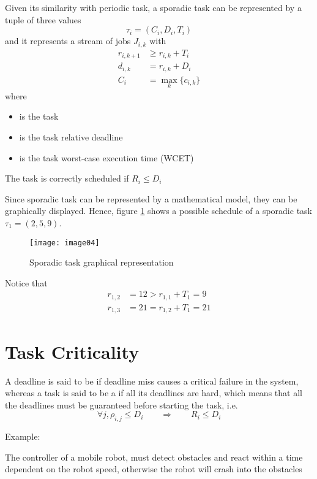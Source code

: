 Given its similarity with periodic task, a sporadic task can be represented by a tuple of three values
\[\tau_i = (C_i, D_i, T_i)\]
and it represents a stream of jobs $J_{i,k}$ with 
\begin{align*}
r_{i,k+1} &\ge r_{i,k} + T_i\\
d_{i,k} &= r_{i,k} + D_i\\
C_{i} &= \max_k \{c_{i,k}\}
\end{align*}
where
\begin{itemize}
\item{ is the task }
\item{ is the task relative deadline}
\item{ is the task worst-case execution time (WCET)}
\end{itemize}
The task is correctly scheduled if $R_i \le D_i$

Since sporadic task can be represented by a mathematical model, they can be graphically displayed. Hence, figure \ref{fig:sporata} shows a possible schedule of a sporadic task $\tau_1 = (2,5,9)$.

\begin{figure}[!h]
\centering
\texttt{[image: image04]}
\caption{Sporadic task graphical representation}
\label{fig:sporata}
\end{figure}

Notice that
\begin{align*}
r_{1,2} &= 12 > r_{1,1} + T_1 = 9\\
r_{1,3} &= 21 = r_{1,2} + T_1 = 21
\end{align*}

\section{Task Criticality}
A deadline is said to be  if  deadline miss causes a critical failure in the system, whereas a task is said to be a  if all its deadlines are hard, which means that all the deadlines must be guaranteed before starting the task, i.e.
\[\forall j, \rho_{i,j} \le D_i \qquad\Rightarrow\qquad R_i \le D_i\]

Example:

The controller of a mobile robot, must detect obstacles and react within a time dependent on the robot speed, otherwise the robot will crash into the obstacles

